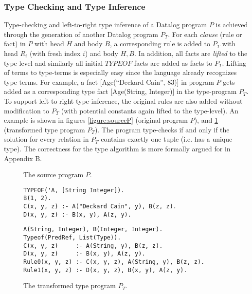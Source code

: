\subsubsection{Type Checking and Type Inference}
Type-checking and left-to-right type inference of a Datalog program $P$ is achieved through the generation of another Datalog program $P_T$. For each \textit{clause} (rule or fact) in $P$ with head $H$ and body $B$, a corresponding rule is added to $P_T$ with head $R_i$ (with fresh index $i$) and body $H, B$. In addition, all facts are \textit{lifted} to the type level and similarly all initial $TYPEOF$-facts are added as facts to $P_T$. Lifting of terms to type-terms is especially easy since the language already recognizes type-terms. For example, a fact [Age(``Deckard Cain'', 83)] in program $P$ gets added as a corresponding type fact [Age(String, Integer)] in the type-program $P_T$. To support left to right type-inference, the original rules are also added without modification to $P_T$ (with potential constants again lifted to the type-level). An example is shown in figures \ref{figure:sourceP} (original program $P$), and \ref{figure:sourcePT} (transformed type program $P_T$). The program type-checks if and only if the solution for every relation in $P_T$ contains exactly one tuple (i.e. has a unique type). The correctness for the type algorithm is more formally argued for in Appendix B.
\vspace*{-15pt}
\begin{figure}[!ht]
\begin{minipage}[b]{.5\textwidth}
\caption{The source program $P$.}
\begin{verbatim}
TYPEOF('A, [String Integer]).
B(1, 2).
C(x, y, z) :- A("Deckard Cain", y), B(z, z).
D(x, y, z) :- B(x, y), A(z, y).
\end{verbatim}
\label{figure:sourceP}
\end{minipage}
\begin{minipage}[b]{.5\textwidth}
\caption{The transformed type program $P_T$.}
\begin{verbatim}
A(String, Integer), B(Integer, Integer).
Typeof(PredRef, List(Type)).
C(x, y, z)     :- A(String, y), B(z, z).
D(x, y, z)     :- B(x, y), A(z, y).
Rule0(x, y, z) :- C(x, y, z), A(String, y), B(z, z).
Rule1(x, y, z) :- D(x, y, z), B(x, y), A(z, y).
\end{verbatim}
\label{figure:sourcePT}
\end{minipage}
\end{figure}
\vspace*{-10pt}

